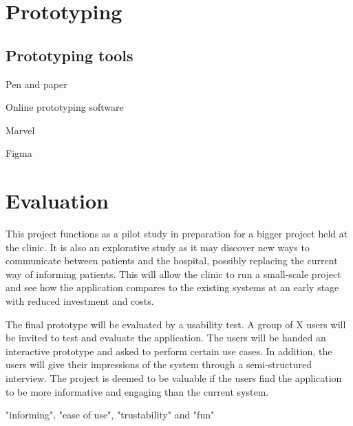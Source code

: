 \section{Prototyping}
\label{sec:prototyping}

\subsection{Prototyping tools}

Pen and paper

Online prototyping software

Marvel

Figma

\section{Evaluation}
\label{sec:evaluation}

This project functions as a pilot study in preparation for a bigger project held at the clinic. It is also an explorative study as it may discover new ways to communicate between patients and the hospital, possibly replacing the current way of informing patients. This will allow the clinic to run a small-scale project and see how the application compares to the existing systems at an early stage with reduced investment and costs.

The final prototype will be evaluated by a usability test. A group of X users will be invited to test and evaluate the application. The users will be handed an interactive prototype and asked to perform certain use cases. In addition, the users will give their impressions of the system through a semi-structured interview. The project is deemed to be valuable if the users find the application to be more informative and engaging than the current system.

"informing", "ease of use", "trustability" and "fun"
